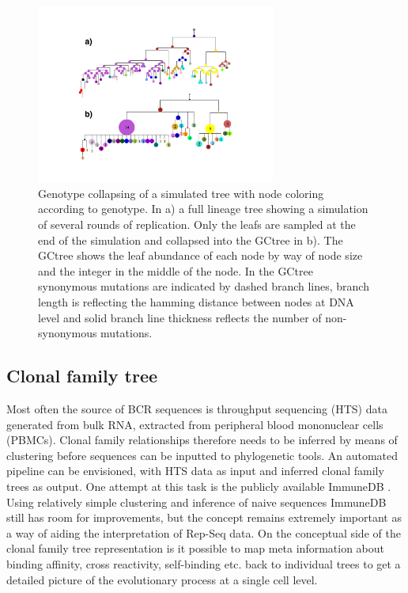 \begin{figure}[!ht]
    \centering
    \includegraphics[width=0.7\textwidth]{figures/collapsed_tree_example.pdf}
    \caption{
        \label{fig:collapsed_tree_example}
        Genotype collapsing of a simulated tree with node coloring according to genotype.
        In a) a full lineage tree showing a simulation of several rounds of replication.
        Only the leafs are sampled at the end of the simulation and collapsed into the GCtree in b).
        The GCtree shows the leaf abundance of each node by way of node size and the integer in the middle of the node.
        In the GCtree synonymous mutations are indicated by dashed branch lines, branch length is reflecting the hamming distance between nodes at DNA level and solid branch line thickness reflects the number of non-synonymous mutations.
    }
\end{figure}





\subsection{Clonal family tree}
Most often the source of BCR sequences is throughput sequencing (HTS) data generated from bulk RNA, extracted from peripheral blood mononuclear cells (PBMCs).
Clonal family relationships therefore needs to be inferred by means of clustering before sequences can be inputted to phylogenetic tools.
An automated pipeline can be envisioned, with HTS data as input and inferred clonal family trees as output.
One attempt at this task is the publicly available ImmuneDB \cite{rosenfeld2017immunedb}.
Using relatively simple clustering and inference of naive sequences ImmuneDB still has room for improvements, but the concept remains extremely important as a way of aiding the interpretation of Rep-Seq data.
On the conceptual side of the clonal family tree representation is it possible to map meta information about binding affinity, cross reactivity, self-binding etc. back to individual trees to get a detailed picture of the evolutionary process at a single cell level.







